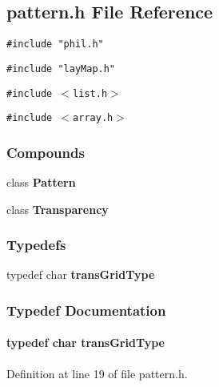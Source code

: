 \subsection{pattern.h File Reference}
\label{pattern.h}
{\tt \#include "phil.h"}\par
{\tt \#include "lay\-Map.h"}\par
{\tt \#include $<$list.h$>$}\par
{\tt \#include $<$array.h$>$}\par
\subsubsection*{Compounds}
\begin{CompactItemize}
\item 
class {\bf Pattern}
\item 
class {\bf Transparency}
\end{CompactItemize}
\subsubsection*{Typedefs}
\begin{CompactItemize}
\item 
typedef char {\bf trans\-Grid\-Type}
\end{CompactItemize}


\subsubsection{Typedef Documentation}
\label{pattern.h_a0}
\paragraph{\setlength{\rightskip}{0pt plus 5cm}typedef char trans\-Grid\-Type}\hfill



Definition at line 19 of file pattern.h.